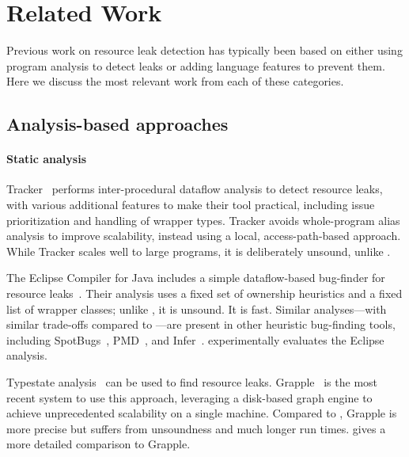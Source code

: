 \section{Related Work}
\label{sec:relatedwork}

Previous work on resource leak detection has typically been based on either
using program analysis to detect leaks or adding language features to prevent
them. Here we discuss the most relevant work from each of these categories.

\subsection{Analysis-based approaches}\label{sec:rw-analysis}


\paragraph{Static analysis}
Tracker~\cite{TorlakC10} performs inter-procedural dataflow analysis to detect
resource leaks, with various additional features to make their tool practical,
including issue prioritization and handling of wrapper types.  Tracker avoids
whole-program alias analysis to improve scalability, instead using a local,
access-path-based approach.  While Tracker scales well to large programs, it is
deliberately unsound, unlike \Tool.

The Eclipse Compiler for Java includes a simple dataflow-based
bug-finder for resource leaks~\cite{ecj-resource-leak}. Their analysis
uses a fixed set of ownership heuristics and a fixed list of wrapper
classes; unlike \Tool, it is unsound. It is fast.  Similar analyses---with similar trade-offs
compared to \Tool---are present in other heuristic bug-finding tools,
including SpotBugs~\cite{spotbugs-resource-leak},
PMD~\cite{pmd-resource-leak}, and Infer~\cite{infer-resource-leak}.
 experimentally evaluates the Eclipse analysis.

Typestate analysis~\cite{StromY86,FinkYDRG2008} can be used to
find resource leaks.  Grapple~\cite{zuo2019grapple} is the most recent system to
use this approach, leveraging a disk-based graph engine to achieve unprecedented
scalability on a single machine.  Compared to \Tool, Grapple is more precise but suffers
from unsoundness and much longer run times.
 gives a more detailed comparison to Grapple.

